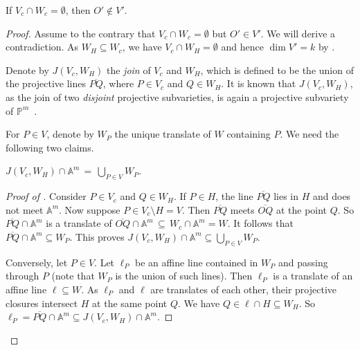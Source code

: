 \documentclass{toc}
\newcommand{\aff}{\mathbb{A}}
\newcommand{\proj}{\mathbb{P}}
\begin{document}
\begin{lemma}\label{lem_projcriterion2}
If  $V_c\cap W_c=\emptyset$, then $O'\not\in V'$. 
\end{lemma}
\begin{proof}

 Assume to the contrary that   $V_c\cap W_c=\emptyset$ but $O'\in V'$. We will derive a contradiction. 
As $W_H\subseteq W_c$, we have  $V_c\cap W_H=\emptyset$ and hence $\dim V'=k$ by .

Denote by $J(V_c, W_H)$ the \emph{join} of $V_c$ and $W_H$, which is defined to be the union of the projective lines $\overline{PQ}$, where $P\in V_c$ and $Q\in W_H$. It is known that $J(V_c, W_H)$, as the join of two \emph{disjoint} projective subvarieties, is again a projective subvariety of $\proj^m$~\cite[Example~6.17]{Har92}. 

For $P\in V$,  denote by $W_P$ the unique translate of $W$ containing $P$. We need the following two 
%
claims. %

\begin{claim}\label{claim_join}
$J(V_c, W_H)\cap \aff^m \,=\, \bigcup_{P\in V} W_P$.
\end{claim}
\begin{proof}[Proof of ]
Consider $P\in V_c$ and $Q\in W_H$. If $P\in H$, the line $\overline{PQ}$ lies in $H$ and does not meet $\aff^m$. Now suppose $P\in V_c\setminus H=V$. Then $\overline{PQ}$ meets $\overline{OQ}$ at the point $Q$. So $\overline{PQ}\cap \aff^m$ is a translate of $\overline{OQ}\cap \aff^m \,\subseteq\, W_c\cap\aff^m = W$. It follows that $\overline{PQ}\cap \aff^m\subseteq W_P$. This proves  $J(V_c, W_H)\cap \aff^m\subseteq \bigcup_{P\in V} W_P$.

Conversely, let $P\in V$.   Let $\ell_P$ be an affine line contained in $W_P$ and passing through $P$ (note that $W_P$ is the union of such lines). Then $\ell_P$ is a translate of an affine line $\ell\subseteq W$. As $\ell_P$ and $\ell$ are translates of each other, their projective closures intersect $H$ at the same point $Q$. We have $Q\in \ell\cap H \subseteq W_H$. So $\ell_P=\overline{PQ}\cap \aff^m\subseteq J(V_c, W_H)\cap \aff^m$.
\end{proof}

%
%
%
%


\end{proof}
\end{document}
